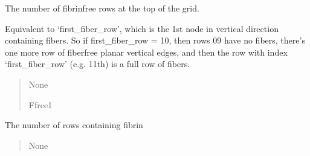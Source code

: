 \documentclass[letterpaper,10pt,english]{sphinxmanual}
\begin{document}
\begin{fulllineitems}
\begin{fulllineitems}
\begin{quote}
\begin{description}
\end{description}\end{quote}

\end{fulllineitems}


\begin{fulllineitems}
\label{\detokenize{lysis.util:lysis.util.parameters.MacroParameters.empty_rows}}
\pysigstartsignatures
{}
\pysigstopsignatures
\sphinxAtStartPar
The number of fibrin\sphinxhyphen{}free rows at the top of the grid.

\sphinxAtStartPar
Equivalent to ‘first\_fiber\_row’, which is the 1st node in vertical
direction containing fibers.
So if first\_fiber\_row = 10, then rows 0\sphinxhyphen{}9 have no fibers, there’s one more
row of fiber\sphinxhyphen{}free planar vertical edges, and then the row with index
‘first\_fiber\_row’ (e.g. 11th) is a full row of fibers.
\begin{quote}\begin{description}
\sphinxAtStartPar
None

\sphinxAtStartPar
Ffree\sphinxhyphen{}1

\end{description}\end{quote}

\end{fulllineitems}


\begin{fulllineitems}
\label{\detokenize{lysis.util:lysis.util.parameters.MacroParameters.fiber_rows}}
\pysigstartsignatures
{}
\pysigstopsignatures
\sphinxAtStartPar
The number of rows containing fibrin
\begin{quote}\begin{description}
\sphinxAtStartPar
None


\end{description}
\end{quote}
\end{fulllineitems}
\end{fulllineitems}
\end{document}
